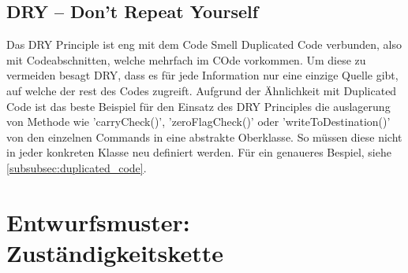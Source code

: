\documentclass[12pt,a4paper,titlepage,ngerman,pdftex]{report}
\begin{document}
    
    \subsection{DRY -- Don't Repeat Yourself}
    Das DRY Principle ist eng mit dem Code Smell Duplicated Code verbunden, also mit Codeabschnitten, welche mehrfach im COde vorkommen. Um diese zu vermeiden besagt DRY, dass es für jede Information nur eine einzige Quelle gibt, auf welche der rest des Codes zugreift.
    Aufgrund der Ähnlichkeit mit Duplicated Code ist das beste Beispiel für den Einsatz des DRY Principles die auslagerung von Methode wie 'carryCheck()', 'zeroFlagCheck()' oder 'writeToDestination()' von den einzelnen Commands in eine abstrakte Oberklasse. So müssen diese nicht in jeder konkreten Klasse neu definiert werden. Für ein genaueres Bespiel, siehe \autoref{subsubsec:duplicated_code}.  

    \section{Entwurfsmuster: Zuständigkeitskette}\label{sec:entwurfsmuster}
\end{document}
